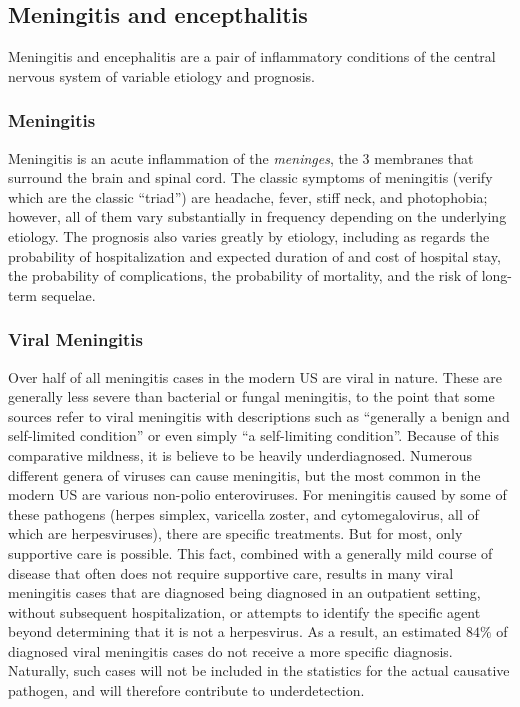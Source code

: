\documentclass[12pt]{article}
\newcommand{\cjh}{\textcolor{blue}{cjh}}
\newcommand{\msg}[3]{(#1 $\rightarrow$ #2: #3)}
\newcommand{\mcc}[1]{\msg\cjh\cjh{#1}}
\begin{document}
        \subsection{Meningitis and encepthalitis}
            \label{m-and-e}
            Meningitis and encephalitis are a pair of inflammatory conditions of the central nervous system of variable etiology and prognosis.
            
            \subsubsection{Meningitis}
                \label{meningitis}
            Meningitis is an acute inflammation of the \textit{meninges}, the 3 membranes that surround the brain and spinal cord. The classic symptoms of meningitis (verify which are the classic ``triad'') are headache, fever, stiff neck, and photophobia; however, all of them vary substantially in frequency depending on the underlying etiology. The prognosis also varies greatly by etiology, including as regards the probability of hospitalization and expected duration of and cost of hospital stay, the probability of complications, the probability of mortality, and the risk of long-term sequelae.

        \subsubsection{Viral Meningitis}
            \label{viral-meningitis}
            Over half of all meningitis cases in the modern US are viral in nature. These are generally less severe than bacterial or fungal meningitis, to the point that some sources refer to viral meningitis with descriptions such as ``generally a benign and self-limited condition''\cite{khetsuriani2003viral} or even simply ``a self-limiting condition''\cite{balada2019cost}. Because of this comparative mildness, it is believe to be heavily underdiagnosed. Numerous different genera of viruses can cause meningitis, but the most common in the modern US are various non-polio enteroviruses. For meningitis caused by some of these pathogens (herpes simplex, varicella zoster, and cytomegalovirus, all of which are herpesviruses), there are specific treatments. But for most, only supportive care is possible. This fact, combined with a generally mild course of disease that often does not require supportive care, results in many viral meningitis cases that are diagnosed being diagnosed in an outpatient setting, without subsequent hospitalization, or attempts to identify the specific agent beyond determining that it is not a herpesvirus. As a result, an estimated $84\%$ of diagnosed viral meningitis cases do not receive a more specific diagnosis\cite{holmquist2008meningitis}. Naturally, such cases will not be included in the statistics for the actual causative pathogen, and will therefore contribute to underdetection.
\end{document}
